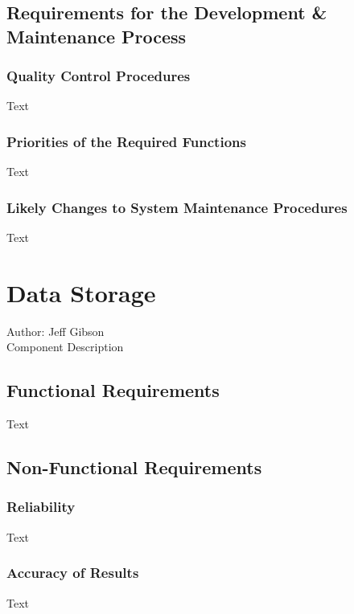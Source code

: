 \documentclass[12pt]{article}
\begin{document}
\subsection{Requirements for the Development & Maintenance Process}

\subsubsection {Quality Control Procedures}

Text

\subsubsection {Priorities of the Required Functions}

Text

\subsubsection {Likely Changes to System Maintenance Procedures}

Text

\section{Data Storage}
Author: Jeff Gibson\\

\noindent Component Description

\subsection{Functional Requirements}

Text

\subsection{Non-Functional Requirements}

\subsubsection {Reliability}

Text

\subsubsection {Accuracy of Results}
 
Text
\end{document}
